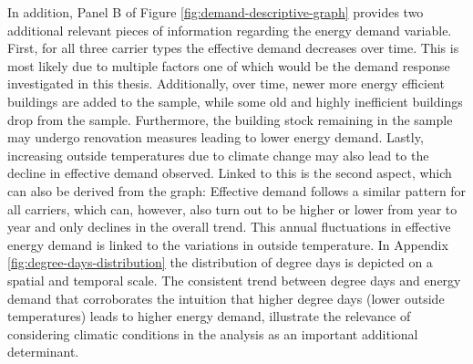 \documentclass[12pt,twoside]{reedthesis}
\begin{document}
In addition, Panel B of Figure \ref{fig:demand-descriptive-graph} provides two additional relevant pieces of information regarding the energy demand variable. First, for all three carrier types the effective demand decreases over time. This is most likely due to multiple factors one of which would be the demand response investigated in this thesis. Additionally, over time, newer more energy efficient buildings are added to the sample, while some old and highly inefficient buildings drop from the sample. Furthermore, the building stock remaining in the sample may undergo renovation measures leading to lower energy demand. Lastly, increasing outside temperatures due to climate change may also lead to the decline in effective demand observed. Linked to this is the second aspect, which can also be derived from the graph: Effective demand follows a similar pattern for all carriers, which can, however, also turn out to be higher or lower from year to year and only declines in the overall trend. This annual fluctuations in effective energy demand is linked to the variations in outside temperature. In Appendix \ref{fig:degree-days-distribution} the distribution of degree days is depicted on a spatial and temporal scale. The consistent trend between degree days and energy demand that corroborates the intuition that higher degree days (lower outside temperatures) leads to higher energy demand, illustrate the relevance of considering climatic conditions in the analysis as an important additional determinant.
\end{document}
